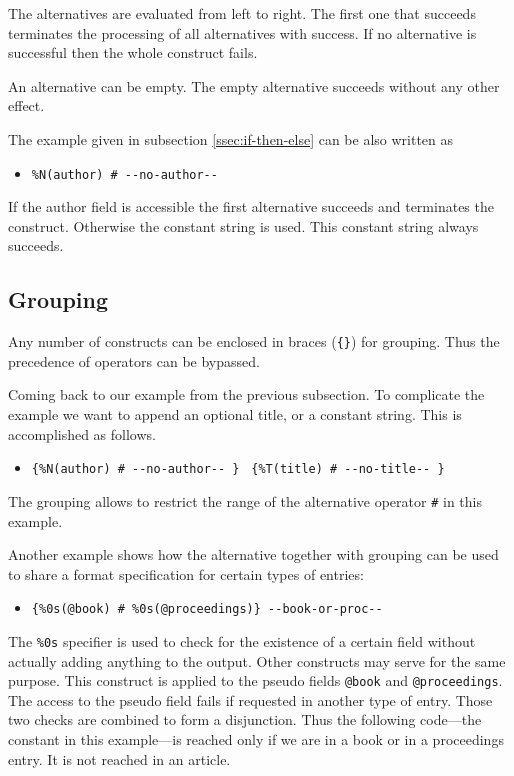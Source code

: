 \documentclass[11pt,a4paper]{scrbook}
\begin{document}
The alternatives are evaluated from left to right. The first one that succeeds
terminates the processing of all alternatives with success. If no alternative
is successful then the whole construct fails.

An alternative can be empty. The empty alternative succeeds without any other
effect.

The example given in subsection \ref{ssec:if-then-else} can be also written as

\begin{itemize}
  \item [] \texttt{\%}\verb|N(author) # --no-author--|
\end{itemize}

If the author field is accessible the first alternative succeeds and
terminates the construct. Otherwise the constant string is used. This constant
string always succeeds.


\subsection{Grouping}

Any number of constructs can be enclosed in braces (\verb|{}|) for grouping.
Thus the precedence of operators can be bypassed.

Coming back to our example from the previous subsection. To complicate the
example we want to append an optional title, or a constant string. This is
accomplished as follows.


\begin{itemize}
  \item [] \verb|{|\texttt{\%}\verb|N(author) # --no-author-- } |
           \verb|{|\texttt{\%}\verb|T(title) # --no-title-- } |
\end{itemize}

The grouping allows to restrict the range of the alternative operator \verb|#|
in this example.

Another example shows how the alternative together with grouping can be
used to share a format specification for certain types of entries:

\begin{itemize}
  \item [] \verb|{|\texttt{\%}\verb|0s(@book) # |\texttt{\%}\verb|0s(@proceedings)} --book-or-proc--|
\end{itemize}

The \texttt{\%}\verb|0s| specifier is used to check for the
existence of a certain field without actually adding anything to the output.
Other constructs may serve for the same purpose. This construct is applied to
the pseudo fields \texttt{@book} and \texttt{@proceedings}. The access to the
pseudo field fails if requested in another type of entry. Those two checks are
combined to form a disjunction. Thus the following code---the constant in this
example---is reached only if we are in a book or in a proceedings entry. It is
not reached in an article.
\end{document}
